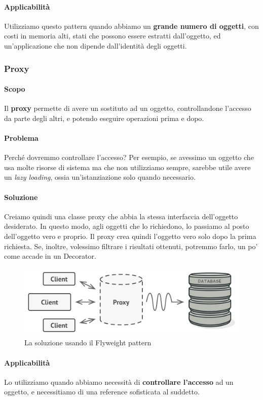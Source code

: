 \documentclass[11pt]{article}
\begin{document}
\paragraph{Applicabilità}
Utilizziamo questo pattern quando abbiamo un \textbf{grande numero di oggetti}, con costi in memoria alti, stati che possono essere estratti dall'oggetto, ed un'applicazione che non dipende dall'identità degli oggetti. 
\subsubsection{Proxy}
\paragraph{Scopo}
Il \textbf{proxy} permette di avere un sostituto ad un oggetto, controllandone l'accesso da parte degli altri, e potendo eseguire operazioni prima e dopo. 
\paragraph{Problema}
Perché dovremmo controllare l'accesso? Per esempio, se avessimo un oggetto che usa molte risorse di sistema ma che non utilizziamo sempre, sarebbe utile avere un \textit{lazy loading}, ossia un'istanziazione solo quando necessario. 

\paragraph{Soluzione}
Creiamo quindi una classe proxy che abbia la stessa interfaccia dell'oggetto desiderato. In questo modo, agli oggetti che lo richiedono, lo passiamo al posto dell'oggetto vero e proprio. Il proxy crea quindi l'oggetto vero solo dopo la prima richiesta. Se, inoltre, volessimo filtrare i risultati ottenuti, potremmo farlo, un po' come accade in un Decorator.
\begin{figure}[H]
    \includegraphics[width=\linewidth]{res/teoria/Proxy.png}
    \caption{La soluzione usando il Flyweight pattern}
\end{figure}
\paragraph{Applicabilità}
Lo utilizziamo quando abbiamo necessità di \textbf{controllare l'accesso} ad un oggetto, e necessitiamo di una reference sofisticata al suddetto.
\end{document}
